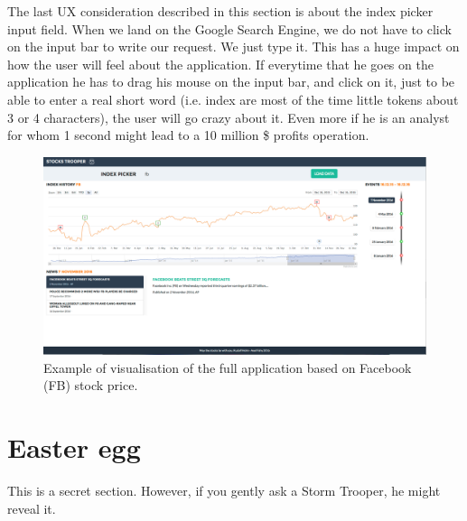 The last UX consideration described in this section is about the index picker input field. When we land on the Google Search Engine, we do not have to click on the input bar to write our request. We just type it. This has a huge impact on how the user will feel about the application. If everytime that he goes on the application he has to drag his mouse on the input bar, and click on it, just to be able to enter a real short word (i.e. index are most of the time little tokens about 3 or 4 characters), the user will go crazy about it. Even more if he is an analyst for whom 1 second might lead to a 10 million \$ profits operation.

\begin{figure}
    \centering
    \includegraphics[max width=\textwidth]{Figures/st-full.png}
    \caption{Example of visualisation of the full application based on Facebook (FB) stock price.}
    \label{fig:full}
\end{figure}

\section{Easter egg}
This is a secret section. However, if you gently ask a Storm Trooper, he might reveal it.
